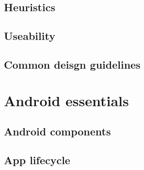 \subsection{Heuristics}
\subsection{Useability}
\subsection{Common deisgn guidelines}

\section{Android essentials}
\subsection{Android components}
\subsection{App lifecycle}
